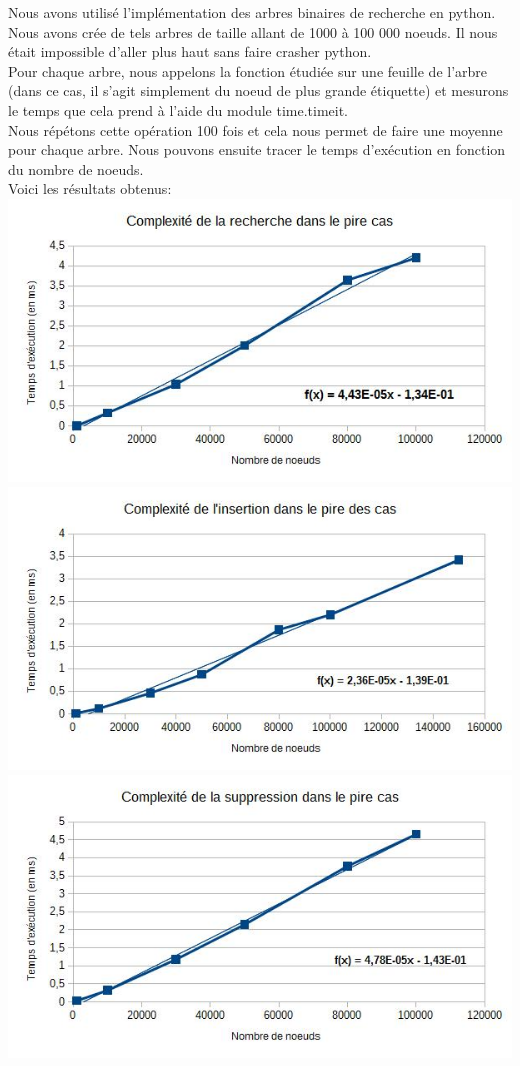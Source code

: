 \documentclass{report}
\begin{document}
Nous avons utilisé l'implémentation des arbres binaires de recherche en python.
Nous avons crée de tels arbres de taille allant de 1000 à 100 000 noeuds. Il nous était impossible d'aller plus haut sans faire crasher python.\\

Pour chaque arbre, nous appelons la fonction étudiée sur une feuille de l'arbre (dans ce cas, il s'agit simplement du noeud de plus grande étiquette) et mesurons le temps que cela prend à l'aide du module time.timeit. \\
Nous répétons cette opération 100 fois et cela nous permet de faire une moyenne pour chaque arbre. Nous pouvons ensuite tracer le temps d'exécution en fonction du nombre de noeuds.\\
Voici les résultats obtenus: \\
\includegraphics[scale=0.65]{images/rech.jpg} \\
\includegraphics[scale=0.65]{images/ins.jpg} \\
\includegraphics[scale=0.65]{images/supp.jpg}
\end{document}
